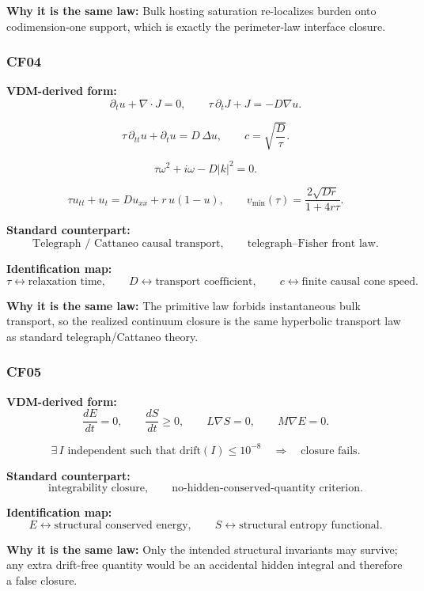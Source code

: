 \documentclass[11pt]{article}
\theoremstyle{definition}
\theoremstyle{plain}
\theoremstyle{remark}
\begin{document}
\textbf{Why it is the same law:} Bulk hosting saturation re-localizes burden
onto codimension-one support, which is exactly the perimeter-law interface
closure.


\subsubsection*{CF04}
\textbf{VDM-derived form:}
\[
\partial_t u + \nabla\!\cdot J = 0,
\qquad
\tau\,\partial_t J + J = -D\nabla u.
\]

\[
\tau\,\partial_{tt}u + \partial_t u = D\,\Delta u,
\qquad
c=\sqrt{\frac{D}{\tau}}.
\]

\[
\tau\omega^2 + i\omega - D|k|^2 = 0.
\]

\[
\tau u_{tt}+u_t = D u_{xx}+r\,u(1-u),
\qquad
v_{\min}(\tau)=\frac{2\sqrt{Dr}}{1+4r\tau}.
\]

\textbf{Standard counterpart:}
\[
\text{Telegraph / Cattaneo causal transport},
\qquad
\text{telegraph--Fisher front law}.
\]

\textbf{Identification map:}
\[
\tau \leftrightarrow \text{relaxation time},
\qquad
D \leftrightarrow \text{transport coefficient},
\qquad
c \leftrightarrow \text{finite causal cone speed}.
\]

\textbf{Why it is the same law:} The primitive law forbids instantaneous bulk
transport, so the realized continuum closure is the same hyperbolic transport
law as standard telegraph/Cattaneo theory.


\subsubsection*{CF05}
\textbf{VDM-derived form:}
\[
\frac{dE}{dt}=0,
\qquad
\frac{dS}{dt}\ge 0,
\qquad
L\nabla S=0,
\qquad
M\nabla E=0.
\]

\[
\exists\, I \text{ independent such that drift}(I)\le 10^{-8}
\quad\Longrightarrow\quad
\text{closure fails}.
\]

\textbf{Standard counterpart:}
\[
\text{integrability closure},
\qquad
\text{no-hidden-conserved-quantity criterion}.
\]

\textbf{Identification map:}
\[
E \leftrightarrow \text{structural conserved energy},
\qquad
S \leftrightarrow \text{structural entropy functional}.
\]

\textbf{Why it is the same law:} Only the intended structural invariants may
survive; any extra drift-free quantity would be an accidental hidden integral
and therefore a false closure.
\end{document}
